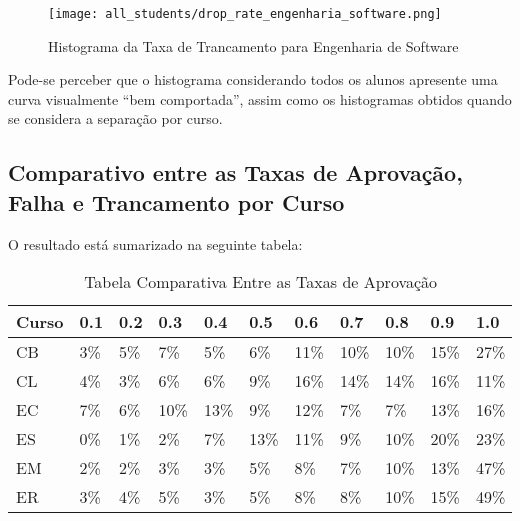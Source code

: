 \begin{figure}[!ht]
    \caption{Histograma da Taxa de Trancamento para Engenharia de Software}
    \centering
    \texttt{[image: all\_students/drop\_rate\_engenharia\_software.png]}
    \label{drop_rate_eng_soft}
\end{figure}

Pode-se perceber que o histograma considerando todos os alunos apresente uma
curva visualmente ``bem comportada'', assim como os histogramas obtidos quando se considera a
separação por curso. \clearpage

\subsection{Comparativo entre as Taxas de Aprovação, Falha e Trancamento por Curso}
O resultado está sumarizado na seguinte tabela: 

\begin{table}
\begin{center}
        \begin{tabular}{|p{2cm}| p{1cm}| p{1cm}| p{1cm} | p{1cm} | p{1cm}| p{1cm}
                |p{1cm} | p{1cm} | p{1cm} | p{1cm}|}

        \hline
        \textbf{Curso} & \textbf{0.1} & \textbf{0.2} & \textbf{0.3} & 
        \textbf{0.4} & \textbf{0.5} & \textbf{0.6} & \textbf{0.7} & \textbf{0.8} &
        \textbf{0.9} & \textbf{1.0} \\
        \hline
        \hline
        CB & 3\% & 5\% & 7\% & 5\% & 6\% &
        11\% & 10\% & 10\% & 15\% & 27\% \\
        \hline
        \hline
        CL & 4\% & 3\% & 6\% & 6\% & 9\% &
        16\% & 14\% & 14\% & 16\% & 11\% \\
        \hline
        \hline
        EC & 7\% & 6\% & 10\% & 13\% & 9\% &
        12\% & 7\% & 7\% & 13\% & 16\% \\
        \hline
        \hline
        ES & 0\% & 1\% & 2\% & 7\% & 13\% &
        11\% & 9\% & 10\% & 20\% & 23\% \\
        \hline
        \hline
        EM & 2\% & 2\% & 3\% & 3\% & 5\% &
        8\% & 7\% & 10\% & 13\% & 47\% \\
        \hline
        \hline
        ER & 3\% & 4\% & 5\% & 3\% & 5\% &
        8\% & 8\% & 10\% & 15\% & 49\% \\
        \hline
\end{tabular}
\end{center}
\caption{Tabela Comparativa Entre as Taxas de Aprovação}
\end{table}

